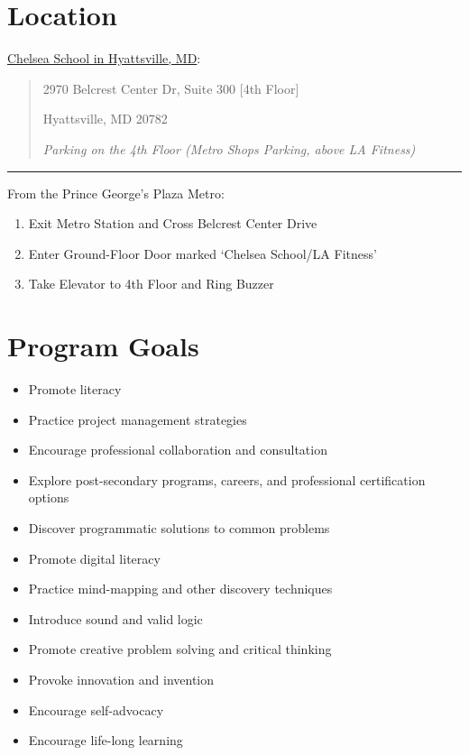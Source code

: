 \documentclass[letterpaper,10pt,english]{sphinxmanual}
\begin{document}
\section{Location}
\label{description:location}
\href{http://chelseaschool.edu/about/directions}{Chelsea School in Hyattsville, MD}:
\begin{quote}

2970 Belcrest Center Dr, Suite 300 {[}4th Floor{]}

Hyattsville, MD 20782

\emph{Parking on the 4th Floor (Metro Shops Parking, above LA Fitness)}
\end{quote}


\bigskip\hrule{}\bigskip


From the Prince George's Plaza Metro:
\begin{enumerate}
\item {} 
Exit Metro Station and Cross Belcrest Center Drive

\item {} 
Enter Ground-Floor Door marked `Chelsea School/LA Fitness'

\item {} 
Take Elevator to 4th Floor and Ring Buzzer

\end{enumerate}


\section{Program Goals}
\label{description:program-goals}\begin{itemize}
\item {} 
Promote literacy

\item {} 
Practice project management strategies

\item {} 
Encourage professional collaboration and consultation

\item {} 
Explore post-secondary programs, careers, and professional certification options

\item {} 
Discover programmatic solutions to common problems

\item {} 
Promote digital literacy

\item {} 
Practice mind-mapping and other discovery techniques

\item {} 
Introduce sound and valid logic

\item {} 
Promote creative problem solving and critical thinking

\item {} 
Provoke innovation and invention

\item {} 
Encourage self-advocacy

\item {} 
Encourage life-long learning

\end{itemize}
\end{document}
